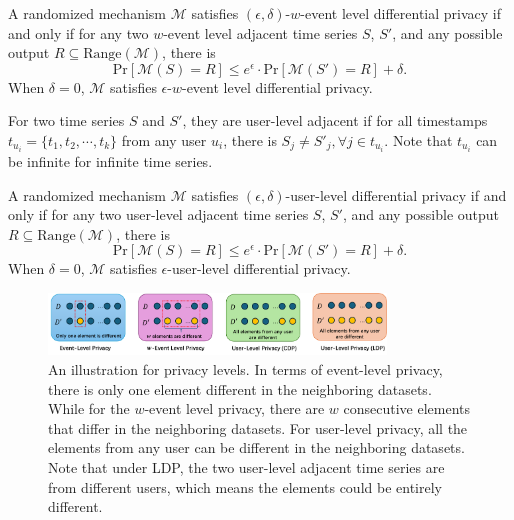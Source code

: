 \begin{definition} A randomized mechanism $\mathcal{M}$ satisfies $(\epsilon, \delta)$-$w$-event level differential privacy if and only if for any two $w$-event level adjacent time series $S$, $S'$, and any possible output $R\subseteq\mathrm{Range}(\mathcal{M})$, there is
	\begin{equation}
		\mathrm{Pr}[\mathcal{M}(S)=R]\le e^\epsilon\cdot \mathrm{Pr}[\mathcal{M}(S')=R]+\delta.\nonumber
	\end{equation}
	When $\delta=0$, $\mathcal{M}$ satisfies $\epsilon$-$w$-event level differential privacy.
\end{definition}

\begin{definition}
	For two time series $S$ and $S'$, they are user-level adjacent if for all timestamps $t_{u_i}=\{t_1, t_2, \cdots , t_k\}$  from any user $u_i$, there is $S_j\ne S'_j, \forall j\in t_{u_i}$. Note that $t_{u_i}$ can be infinite for infinite time series.
\end{definition}

\begin{definition} A randomized mechanism $\mathcal{M}$ satisfies $(\epsilon, \delta)$-user-level differential privacy if and only if for any two user-level adjacent time series $S$, $S'$, and any possible output $R\subseteq\mathrm{Range}(\mathcal{M})$, there is
	\begin{equation}
		\mathrm{Pr}[\mathcal{M}(S)=R]\le e^\epsilon\cdot \mathrm{Pr}[\mathcal{M}(S')=R]+\delta.\nonumber
	\end{equation}
	When $\delta=0$, $\mathcal{M}$ satisfies $\epsilon$-user-level differential privacy.
\end{definition}

\begin{figure}[H]
	\centering
	\includegraphics[width=0.8\textwidth]{submissions/submission4/figs/02-pre/privacy_level-crop.pdf}
	\caption{An illustration for privacy levels. In terms of event-level privacy, there is only one element different in the neighboring datasets. While for the $w$-event level privacy, there are $w$ consecutive elements that differ in the neighboring datasets. For user-level privacy, all the elements from any user can be different in the neighboring datasets. Note that under LDP, the two user-level adjacent time series are from different users, which means the elements could be entirely different. }
	\label{privacy_level}
\end{figure}


